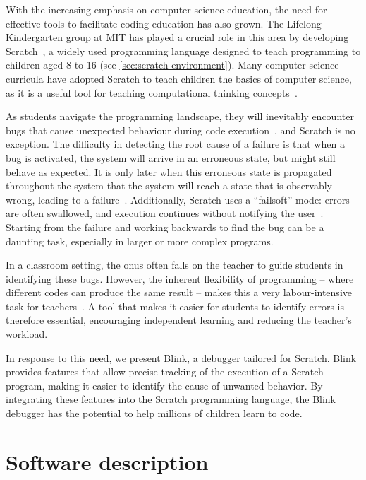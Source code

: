 \documentclass[../main]{subfiles}
\begin{document}
With the increasing emphasis on computer science education, the need for effective tools to facilitate coding education has also grown.
The Lifelong Kindergarten group at MIT has played a crucial role in this area by developing Scratch~\autocite{resnickScratchProgrammingAll2009}, a widely used programming language designed to teach programming to children aged 8 to 16 (see \cref{sec:scratch-environment}).
Many computer science curricula have adopted Scratch to teach children the basics of computer science, as it is a useful tool for teaching computational thinking concepts~\autocite{zhangSystematicReviewLearning2019}.

As students navigate the programming landscape, they will inevitably encounter bugs that cause unexpected behaviour during code execution~\autocite{zellerWhyProgramsFail2009a}, and Scratch is no exception.
The difficulty in detecting the root cause of a failure is that when a bug is activated, the system will arrive in an erroneous state, but might still behave as expected.
It is only later when this erroneous state is propagated throughout the system that the system will reach a state that is observably wrong, leading to a failure~\autocite{ammannIntroductionSoftwareTesting2016}.
Additionally, Scratch uses a ``failsoft'' mode: errors are often swallowed, and execution continues without notifying the user~\autocite{hromkovic2021problem}.
Starting from the failure and working backwards to find the bug can be a daunting task, especially in larger or more complex programs.

In a classroom setting, the onus often falls on the teacher to guide students in identifying these bugs.
However, the inherent flexibility of programming -- where different codes can produce the same result -- makes this a very labour-intensive task for teachers~\autocite{kimDebuggingBlockbasedProgramming2018}.
A tool that makes it easier for students to identify errors is therefore essential, encouraging independent learning and reducing the teacher's workload.

In response to this need, we present Blink, a debugger tailored for Scratch.
Blink provides features that allow precise tracking of the execution of a Scratch program, making it easier to identify the cause of unwanted behavior.
By integrating these features into the Scratch programming language, the Blink debugger has the potential to help millions of children learn to code.

\section{Software description}\label{sec:blink-software-description}
\end{document}

